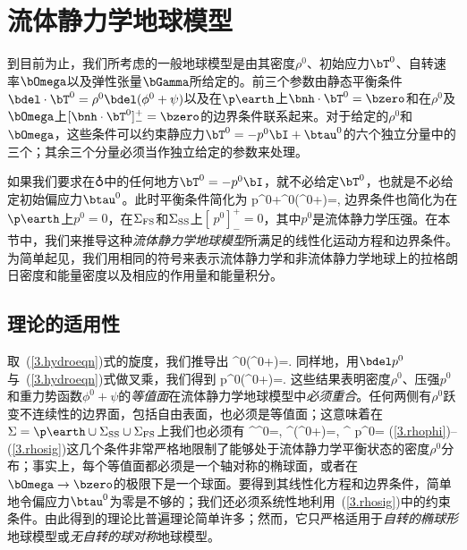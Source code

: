 {\section{流体静力学地球模型}
%
%
\label{3.sec.hydro}

到目前为止，我们所考虑的一般地球模型是由其密度$\rho^0$、初始应力$\bT^0$、自转速率$\bOmega$以及弹性张量$\bGamma$所给定的。前三个参数由静态平衡条件$\bdel\cdot\bT^0=\rho^0\bdel(\phi^0+\psi)$以及在$\p\earth$上$\bnh\cdot\bT^0=\bzero$和在$\rho^0$及$\bOmega$上$[\bnh\cdot\bT^0]^+_-=\bzero$的边界条件联系起来。对于给定的$\rho^0$和$\bOmega$，这些条件可以约束静应力$\bT^0=-p^0\bI+\btau^0$的六个独立分量中的三个；其余三个分量必须当作独立给定的参数来处理。

如果我们要求在$\earth$中的任何地方$\bT^0=-p^0\bI$，就不必给定$\bT^0$，也就是不必给定初始偏应力$\btau^0$。此时平衡条件简化为
\eq
\label{3.hydroeqn}
\bdel p^0+\rho^0\bdel(\phi^0+\psi)=\bzero,
\en
边界条件也简化为在$\p\earth$上$p^0=0$，在$\Sigma_{\rm FS}$和$\Sigma_{\rm SS}$上$[\,p^0]^+_-=0$，其中$p^0$是流体静力学压强。在本节中，我们来推导这种{\em 流体静力学地球模型\/}所满足的线性化运动方程和边界条件。为简单起见，我们用相同的符号来表示流体静力学和非流体静力学地球上的拉格朗日密度和能量密度以及相应的作用量和能量积分。

\subsection{理论的适用性}
\label{3.hydroapply}

取~(\ref{3.hydroeqn})式的旋度，我们推导出
\eq
\label{3.rhophi}
\bdel\rho^0\times\bdel(\phi^0+\psi)=\bzero.
\en
同样地，用$\bdel p^0$与~(\ref{3.hydroeqn})式做叉乘，我们得到
\eq
\label{3.pnotphi}
\bdel p^0\times\bdel(\phi^0+\psi)=\bzero.
\en
这些结果表明密度$\rho^0$、压强$p^0$和重力势函数$\phi^0+\psi$的{\em 等值面\/}在流体静力学地球模型中{\em 必须重合\/}。任何两侧有$\rho^0$跃变不连续性的边界面，包括自由表面，也必须是等值面；这意味着在$\Sigma=\p\earth\cup\Sigma_{\rm SS}\cup\Sigma_{\rm FS}$上我们也必须有
\eq
\label{3.rhosig}
\bdel^{\Sigma}\rho^0=\bzero,\qquad
\bdel^{\Sigma}(\phi^0+\psi)=\bzero,\qquad
\bdel^{\Sigma} p^0=\bzero
\en
(\ref{3.rhophi})--(\ref{3.rhosig})这几个条件非常严格地限制了能够处于流体静力学平衡状态的密度$\rho^0$分布；事实上，每个等值面都必须是一个轴对称的椭球面，或者在$\bOmega\rightarrow\bzero$的极限下是一个球面。要得到其线性化方程和边界条件，简单地令偏应力$\btau^0$为零是不够的；我们还必须系统性地利用~(\ref{3.rhosig})中的约束条件。由此得到的理论比普遍理论简单许多；然而，它只严格适用于{\em 自转的椭球形\/}地球模型或{\em 无自转的球对称\/}地球模型。
%
%

}

